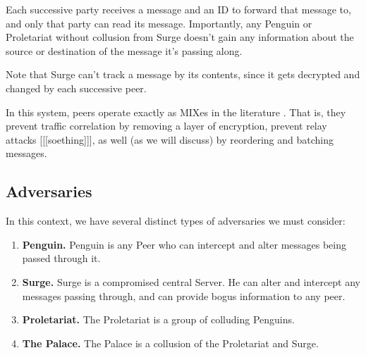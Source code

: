 \documentclass[twocolumn]{paper}
\begin{document}
Each successive party receives a message and an ID to forward that message to, and only that party can read its message. Importantly, any Penguin or Proletariat without collusion from Surge doesn't gain any information about the source or destination of the message it's passing along. 

Note that Surge can't track a message by its contents, since it gets decrypted and changed by each successive peer. 

In this system, peers operate exactly as MIXes in the literature \cite{chaum-mix} . That is, they prevent traffic correlation by removing a layer of encryption, prevent relay attacks [[[soething]]], as well (as we will discuss) by reordering and batching messages. 
\subsection{Adversaries}
In this context, we have several distinct types of adversaries we must consider:
\begin{enumerate}
  \item\textbf{Penguin.} Penguin is any Peer who can intercept and alter messages being passed through it. 
  \item\textbf{Surge.} Surge is a compromised central Server. He can alter and intercept any messages passing through, and can provide bogus information to any peer.
  \item\textbf{Proletariat.} The Proletariat is a group of colluding Penguins.
  \item\textbf{The Palace.} The Palace is a collusion of the Proletariat and Surge.
\end{enumerate}
\end{document}
